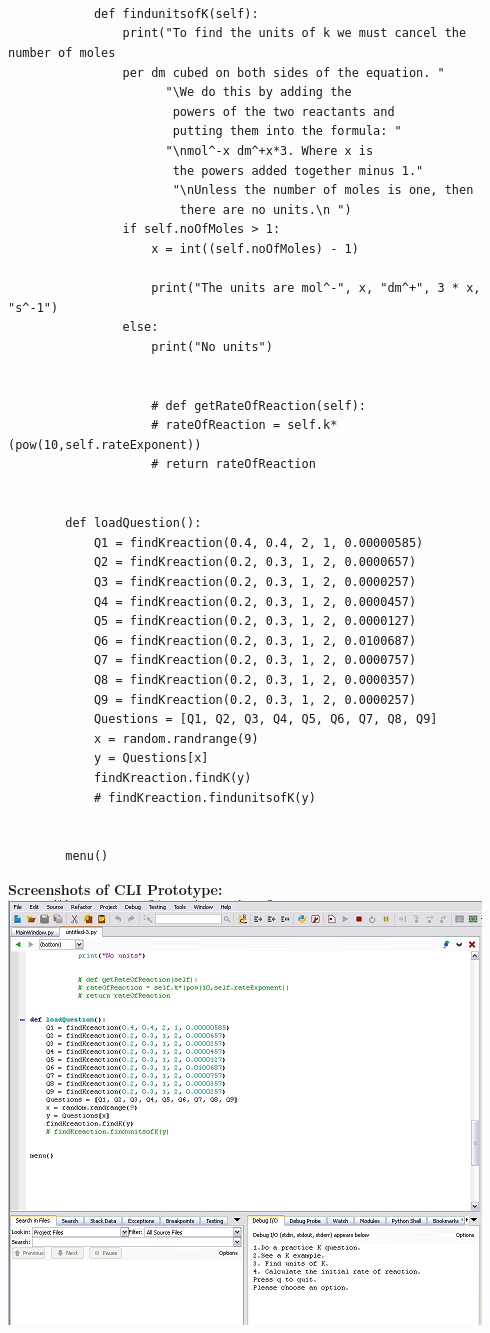 \documentclass[a4paper,12pt]{report}
\begin{document}
\begin{verbatim}
                            
        
        
            def findunitsofK(self):
                print("To find the units of k we must cancel the number of moles 
                per dm cubed on both sides of the equation. "
                      "\We do this by adding the
                       powers of the two reactants and
                       putting them into the formula: "
                      "\nmol^-x dm^+x*3. Where x is
                       the powers added together minus 1."
                       "\nUnless the number of moles is one, then
                        there are no units.\n ")
                if self.noOfMoles > 1:
                    x = int((self.noOfMoles) - 1)
        
                    print("The units are mol^-", x, "dm^+", 3 * x, "s^-1")
                else:
                    print("No units")
        
        
                    # def getRateOfReaction(self):
                    # rateOfReaction = self.k*(pow(10,self.rateExponent))
                    # return rateOfReaction
        
        
        def loadQuestion():
            Q1 = findKreaction(0.4, 0.4, 2, 1, 0.00000585)
            Q2 = findKreaction(0.2, 0.3, 1, 2, 0.0000657)
            Q3 = findKreaction(0.2, 0.3, 1, 2, 0.0000257)
            Q4 = findKreaction(0.2, 0.3, 1, 2, 0.0000457)
            Q5 = findKreaction(0.2, 0.3, 1, 2, 0.0000127)
            Q6 = findKreaction(0.2, 0.3, 1, 2, 0.0100687)
            Q7 = findKreaction(0.2, 0.3, 1, 2, 0.0000757)
            Q8 = findKreaction(0.2, 0.3, 1, 2, 0.0000357)
            Q9 = findKreaction(0.2, 0.3, 1, 2, 0.0000257)
            Questions = [Q1, Q2, Q3, Q4, Q5, Q6, Q7, Q8, Q9]
            x = random.randrange(9)
            y = Questions[x]
            findKreaction.findK(y)
            # findKreaction.findunitsofK(y)
        
        
        menu()
\end{verbatim}
\clearpage
\textbf{Screenshots of CLI Prototype:}\\
\bigskip
\includegraphics{CLI01}\\
\end{document}
